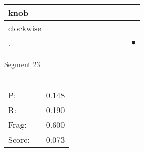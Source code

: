 \documentclass[landscape]{article}
\newcommand{\ssp}{\hspace{2pt}}
\newcommand{\mex}{\cellcolor{g}$\bullet$}
\begin{document}
\begin{tabular}{|l|p{10pt}|p{10pt}|p{10pt}|p{10pt}|p{10pt}|p{10pt}|p{10pt}|p{10pt}|p{10pt}|p{10pt}|p{10pt}|}
\hline
\ssp knob \ssp&\hspace{2pt}&\hspace{2pt}&\hspace{2pt}&\hspace{2pt}&\hspace{2pt}&\hspace{2pt}&\hspace{2pt}&\hspace{2pt}&\hspace{2pt}&\hspace{2pt}&\hspace{2pt}\\
\hline
\ssp clockwise \ssp&\hspace{2pt}&\hspace{2pt}&\hspace{2pt}&\hspace{2pt}&\hspace{2pt}&\hspace{2pt}&\hspace{2pt}&\hspace{2pt}&\hspace{2pt}&\hspace{2pt}&\hspace{2pt}\\
\hline
\ssp \cellcolor{ref10}. \ssp&\hspace{2pt}&\hspace{2pt}&\hspace{2pt}&\hspace{2pt}&\hspace{2pt}&\hspace{2pt}&\hspace{2pt}&\hspace{2pt}&\hspace{2pt}&\hspace{2pt}&\hspace{2pt}\mex\\
\hline
\end{tabular}

\vspace{6pt}
\noindent Segment 23\\\\
\noindent\begin{tabular}{lm{12pt}r}
\hline
P:&&0.148\\
R:&&0.190\\
Frag:&&0.600\\
Score:&&0.073\\
\end{tabular}
\end{document}
